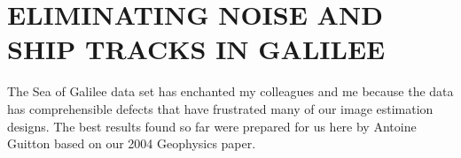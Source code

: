 \begin{comment}
\par
The fitting residuals
are shown in Figure~\ref{fig:jesse9_res}.
\activeplot{jesse9_res}{width=6.0in, height=2.31in}{}{
	The residual at
	fifty thousand of the half million (537,974) data points
	in Figure~\ref{fig:jesse9}.
	Left is physical residual $\bold L\bold A^{-1}\bold p -\bold d$.
	Right is fitting residual
	$\bold W {d\over dt} (\bold L\bold A^{-1}\bold p -\bold d)$.
	}
The physical altitude residuals tend to be rectangles,
each the duration of a track.
While the satellite is overflying other earth locations the ocean surface
is changing its altitude.
The fitting residuals (right side) are very fuzzy.
They appear to be ``white'', though with ten thousand points
crammed onto a line a couple inches long, we cannot be certain.
We could inspect this further.
If the residuals turn out to be significantly non-white,
we might do better to change $d\over dt$ to a PEF along the track.















\end{comment}


\section{ELIMINATING NOISE AND SHIP TRACKS IN GALILEE}

\par
The Sea of Galilee data set has enchanted my colleagues and me
because the data has comprehensible defects
that have frustrated many of our image estimation designs.
The best results found so far were prepared for us here
by Antoine Guitton based on our 2004 Geophysics paper.

\par

